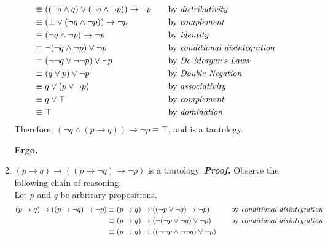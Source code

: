 \documentclass[11pt,a4paper]{article}
\begin{document}
\begin{enumerate}
\begin{enumerate}
\begin{align*}
        &\equiv ((\neg q \land q) \lor (\neg q \land \neg p)) \rightarrow \neg p
            &\quad
            &\text{by \emph{distributivity}} \\
        &\equiv (\bot \lor (\neg q \land \neg p)) \rightarrow \neg p
            &\quad 
            &\text{by \emph{complement}} \\
        &\equiv (\neg q \land \neg p) \rightarrow \neg p
            &\quad
            &\text{by \emph{identity}} \\
        &\equiv \neg(\neg q \land \neg p) \lor \neg p
            &\quad 
            &\text{by \emph{conditional disintegration}} \\
        &\equiv (\neg \neg q \lor \neg \neg p) \lor \neg p
            &\quad
            &\text{by \emph{De Morgan's Laws}} \\
        &\equiv (q \lor p) \lor \neg p
            &\quad
            &\text{by \emph{Double Negation}} \\
        &\equiv q \lor (p \lor \neg p)
            &\quad 
            &\text{by \emph{associativity}} \\
        &\equiv q \lor \top
            &\quad
            &\text{by \emph{complement}} \\
        &\equiv \top
            &\quad
            &\text{by \emph{domination}}
    \end{align*}
    Therefore, $(\neg q \land (p \rightarrow q)) \rightarrow \neg p \equiv \top$, and is a tautology.
        \begin{flushright}
            \textbf{Ergo.}
        \end{flushright}
        \pagebreak
        \item 
        $(p \rightarrow q) \rightarrow ((p \rightarrow \neg q) \rightarrow \neg p)$ is a tautology. 
        \emph{\textbf{Proof.}} Observe the following chain of reasoning. \\ 
        Let $p$ and $q$ be arbitrary propositions.
    \begin{align*}
    (p \rightarrow q) \rightarrow ((p \rightarrow \neg q) \rightarrow \neg p)
        &\equiv (p \rightarrow q) \rightarrow ((\neg p \lor \neg q) \rightarrow \neg p)
            &\quad
            &\text{by \emph{conditional disintegration}} \\
        &\equiv (p \rightarrow q) \rightarrow (\neg(\neg p \lor \neg q) \lor \neg p)
            &\quad
            &\text{by \emph{conditional disintegration}} \\
        &\equiv (p \rightarrow q) \rightarrow ((\neg \neg p \land \neg \neg q) \lor \neg p)

\end{align*}
\end{enumerate}
\end{enumerate}
\end{document}
